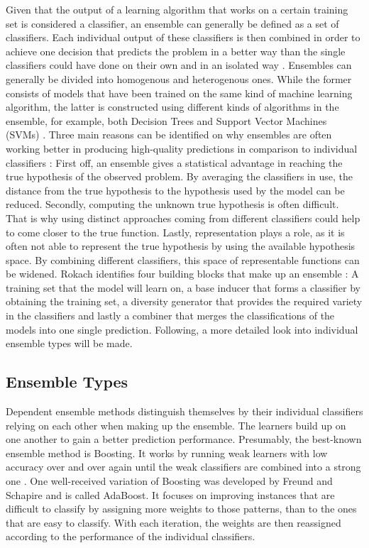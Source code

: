 Given that the output of a learning algorithm that works on a certain training set is considered a classifier, an ensemble can generally be defined as a set of classifiers. Each individual output of these classifiers is then combined in order to achieve one decision that predicts the problem in a better way than the single classifiers could have done on their own and in an isolated way \cite{dietterich2000}. Ensembles can generally be divided into homogenous and heterogenous ones. While the former consists of models that have been trained on the same kind of machine learning algorithm, the latter is constructed using different kinds of algorithms in the ensemble, for example, both Decision Trees and Support Vector Machines (SVMs) \cite{zhou2012}. Three main reasons can be identified on why ensembles are often working better in producing high-quality predictions in comparison to individual classifiers \cite{dietterich2000}: First off, an ensemble gives a statistical advantage in reaching the true hypothesis of the observed problem. By averaging the classifiers in use, the distance from the true hypothesis to the hypothesis used by the model can be reduced. Secondly, computing the unknown true hypothesis is often difficult. That is why using distinct approaches coming from different classifiers could help to come closer to the true function. Lastly, representation plays a role, as it is often not able to represent the true hypothesis by using the available hypothesis space. By combining different classifiers, this space of representable functions can be widened. Rokach identifies four building blocks that make up an ensemble \cite{rokach2010}: A training set that the model will learn on, a base inducer that forms a classifier by obtaining the training set, a diversity generator that provides the required variety in the classifiers and lastly a combiner that merges the classifications of the models into one single prediction. Following, a more detailed look into individual ensemble types will be made.



\subsection{Ensemble Types}

Dependent ensemble methods distinguish themselves by their individual classifiers relying on each other when making up the ensemble. The learners build up on one another to gain a better prediction performance. Presumably, the best-known ensemble method is Boosting. It works by running weak learners with low accuracy over and over again until the weak classifiers are combined into a strong one \cite{rokach2010}. One well-received variation of Boosting was developed by Freund and Schapire \cite{freund1995} and is called AdaBoost. It focuses on improving instances that are difficult to classify by assigning more weights to those patterns, than to the ones that are easy to classify. With each iteration, the weights are then reassigned according to the performance of the individual classifiers.

